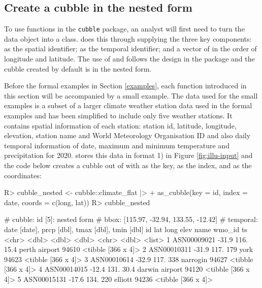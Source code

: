 \documentclass[
]{jss}
\begin{document}
\hypertarget{create-a-cubble-in-the-nested-form}{%
\subsection{Create a cubble in the nested
form}\label{create-a-cubble-in-the-nested-form}}

To use functions in the \texttt{cubble} package, an analyst will first
need to turn the data object into a  class.
 does this through supplying the three key components:
 as the spatial identifier;  as the temporal
identifier; and a vector of  in the order of longitude and
latitude. The use of  and  follows the design in
the  package and the cubble created by default is in the
nested form.

Before the formal examples in Section \ref{examples}, each function
introduced in this section will be accompanied by a small example. The
data used for the small examples is a subset of a larger climate weather
station data used in the formal examples and has been simplified to
include only five weather stations. It contains spatial information of
each station: station id, latitude, longitude, elevation, station name
and World Meteorology Organisation ID and also daily temporal
information of date, maximum and minimum temperature and precipitation
for 2020.  stores this data in format 1) in Figure
\ref{fig:illu-input} and the code below creates a cubble out of
 with  as the key,  as the index,
and  as the coordinates:

\begin{CodeChunk}
\begin{CodeInput}
R> cubble_nested <- cubble::climate_flat |>
+   as_cubble(key = id, index = date, coords = c(long, lat))
R> cubble_nested
\end{CodeInput}
\begin{CodeOutput}
# cubble:   id [5]: nested form
# bbox:     [115.97, -32.94, 133.55, -12.42]
# temporal: date [date], prcp [dbl], tmax [dbl], tmin [dbl]
  id            lat  long  elev name           wmo_id ts                
  <chr>       <dbl> <dbl> <dbl> <chr>           <dbl> <list>            
1 ASN00009021 -31.9  116.  15.4 perth airport   94610 <tibble [366 x 4]>
2 ASN00010311 -31.9  117. 179   york            94623 <tibble [366 x 4]>
3 ASN00010614 -32.9  117. 338   narrogin        94627 <tibble [366 x 4]>
4 ASN00014015 -12.4  131.  30.4 darwin airport  94120 <tibble [366 x 4]>
5 ASN00015131 -17.6  134. 220   elliott         94236 <tibble [366 x 4]>
\end{CodeOutput}
\end{CodeChunk}
\end{document}
